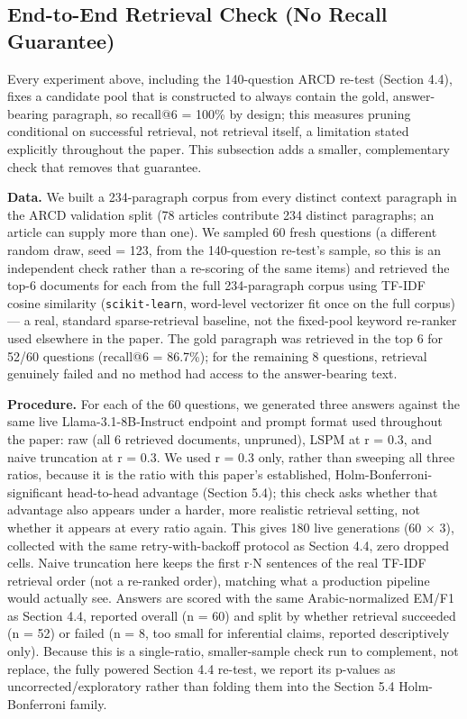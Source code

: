 \subsection{End-to-End Retrieval Check (No Recall Guarantee)}
Every experiment above, including the 140-question ARCD re-test (Section 4.4), fixes a candidate pool that is constructed to always contain the gold, answer-bearing paragraph, so recall@6 = 100\% by design; this measures pruning conditional on successful retrieval, not retrieval itself, a limitation stated explicitly throughout the paper. This subsection adds a smaller, complementary check that removes that guarantee.

\textbf{Data.} We built a 234-paragraph corpus from every distinct context paragraph in the ARCD validation split (78 articles contribute 234 distinct paragraphs; an article can supply more than one). We sampled 60 fresh questions (a different random draw, seed = 123, from the 140-question re-test's sample, so this is an independent check rather than a re-scoring of the same items) and retrieved the top-6 documents for each from the full 234-paragraph corpus using TF-IDF cosine similarity (\texttt{scikit-learn}, word-level vectorizer fit once on the full corpus) --- a real, standard sparse-retrieval baseline, not the fixed-pool keyword re-ranker used elsewhere in the paper. The gold paragraph was retrieved in the top 6 for 52/60 questions (recall@6 = 86.7\%); for the remaining 8 questions, retrieval genuinely failed and no method had access to the answer-bearing text.

\textbf{Procedure.} For each of the 60 questions, we generated three answers against the same live Llama-3.1-8B-Instruct endpoint and prompt format used throughout the paper: raw (all 6 retrieved documents, unpruned), LSPM at r = 0.3, and naive truncation at r = 0.3. We used r = 0.3 only, rather than sweeping all three ratios, because it is the ratio with this paper's established, Holm-Bonferroni-significant head-to-head advantage (Section 5.4); this check asks whether that advantage also appears under a harder, more realistic retrieval setting, not whether it appears at every ratio again. This gives 180 live generations (60 $\times$ 3), collected with the same retry-with-backoff protocol as Section 4.4, zero dropped cells. Naive truncation here keeps the first r$\cdot$N sentences of the real TF-IDF retrieval order (not a re-ranked order), matching what a production pipeline would actually see. Answers are scored with the same Arabic-normalized EM/F1 as Section 4.4, reported overall (n = 60) and split by whether retrieval succeeded (n = 52) or failed (n = 8, too small for inferential claims, reported descriptively only). Because this is a single-ratio, smaller-sample check run to complement, not replace, the fully powered Section 4.4 re-test, we report its p-values as uncorrected/exploratory rather than folding them into the Section 5.4 Holm-Bonferroni family.

